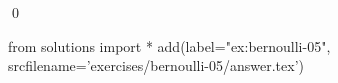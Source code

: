 
\begin{ex} 
  \label{ex:bernoulli-05}
  
  \qed
\end{ex} 
\begin{python0}
from solutions import *
add(label="ex:bernoulli-05",
    srcfilename='exercises/bernoulli-05/answer.tex') 
\end{python0}
